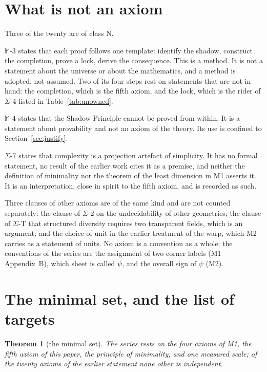 \documentclass[11pt,a4paper]{article}
\theoremstyle{plain}
\newtheorem{theorem}{Theorem}[section]
\theoremstyle{definition}
\theoremstyle{remark}
\newcommand{\Max}[1]{$\mathbb{M}$-#1}
\newcommand{\Sig}[1]{$\Sigma$-#1}
\begin{document}
\section{What is not an axiom}\label{sec:notaxioms}

Three of the twenty are of class N.

\Max{3} states that each proof follows one template: identify the shadow, construct the completion, prove a lock, derive the consequence. This is a method. It is not a statement about the universe or about the mathematics, and a method is adopted, not assumed. Two of its four steps rest on statements that are not in hand: the completion, which is the fifth axiom, and the lock, which is the rider of \Sig{4} listed in Table~\ref{tab:unowned}.

\Max{4} states that the Shadow Principle cannot be proved from within. It is a statement about provability and not an axiom of the theory. Its use is confined to Section~\ref{sec:justify}.

\Sig{7} states that complexity is a projection artefact of simplicity. It has no formal statement, no result of the earlier work cites it as a premise, and neither the definition of minimality nor the theorem of the least dimension in M1 asserts it. It is an interpretation, close in spirit to the fifth axiom, and is recorded as such.

Three clauses of other axioms are of the same kind and are not counted separately: the clause of \Sig{2} on the undecidability of other geometries; the clause of \Sig{T} that structured diversity requires two transparent fields, which is an argument; and the choice of unit in the earlier treatment of the warp, which M2 carries as a statement of units. No axiom is a convention as a whole; the conventions of the series are the assignment of two corner labels (M1 Appendix~B), which sheet is called $\psi$, and the overall sign of $\psi$ (M2).

\section{The minimal set, and the list of targets}\label{sec:result}

\begin{theorem}[the minimal set]\label{thm:minimal}
The series rests on the four axioms of M1, the fifth axiom of this paper, the principle of minimality, and one measured scale; of the twenty axioms of the earlier statement none other is independent.
\end{theorem}
\end{document}

